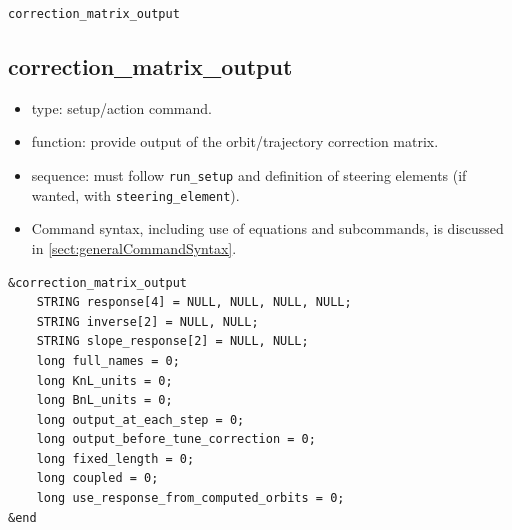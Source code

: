 \documentclass[11pt]{article}
\begin{document}
\newpage
\begin{center}{\Large\verb|correction_matrix_output|}\end{center}
\subsection{correction\_matrix\_output \label{subsec:correctionmatrixoutput}}

\begin{itemize}
\item type: setup/action command.
\item function: provide output of the orbit/trajectory correction matrix.
\item sequence: must follow \verb|run_setup| and definition of steering elements (if wanted, with \verb|steering_element|).
\item Command syntax, including use of equations and subcommands, is discussed in \ref{sect:generalCommandSyntax}.
\end{itemize}

\begin{verbatim}
&correction_matrix_output
    STRING response[4] = NULL, NULL, NULL, NULL;
    STRING inverse[2] = NULL, NULL;
    STRING slope_response[2] = NULL, NULL;
    long full_names = 0;
    long KnL_units = 0;
    long BnL_units = 0;
    long output_at_each_step = 0;
    long output_before_tune_correction = 0;
    long fixed_length = 0;
    long coupled = 0;
    long use_response_from_computed_orbits = 0;
&end
\end{verbatim}
\end{document}
